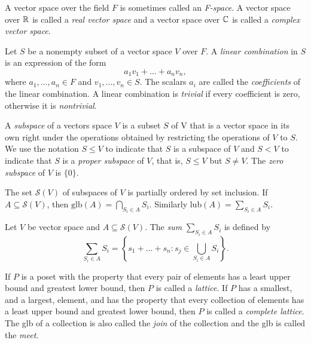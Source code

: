 \documentclass[12pt]{article}
\begin{document}
\begin{definition}[F-space]
    A vector space over the field $F$ is sometimes called an \textit{F-space}. A vector space over $\mathbb{R}$ is called a \textit{real vector space} and a vector space over $\mathbb{C}$ is called a \textit{complex vector space}.
\end{definition}
\newpage
\begin{definition}
    Let $S$ be a nonempty subset of a vector space $V$ over $F$. A \textit{linear combination} in $S$ is an expression of the form
    \begin{equation*}
        a_1v_1+\dots+a_nv_n,
    \end{equation*}
    where $a_1,\dots, a_n\in F$ and $v_1,\dots, v_n\in S$. The scalars $a_i$ are called the \textit{coefficients} of the linear combination. A linear combination is \textit{trivial} if every coefficient is zero, otherwise it is \textit{nontrivial}.
\end{definition}
\begin{definition}[Subspace]
    A \textit{subspace} of a vectors space $V$ is a subset $S$ of V that is a vector space in its own right under the operations obtained by restricting the operations of $V$ to $S$. We use the notation $S\leq V$ to indicate that $S$ is a subspace of $V$ and $S<V$ to indicate that $S$ is a \textit{proper subspace} of $V$, that is, $S\leq V$ but $S\neq V$. The \textit{zero subspace} of $V$ is $\{0\}$.
\end{definition}
\begin{remark}
    The set $\mathcal{S}(V)$ of subspaces of $V$ is partially ordered by set inclusion. If $A\subseteq \mathcal{S}(V)$, then $\text{glb}(A)=\bigcap_{S_i\in A} S_i$. Similarly lub$(A)=\sum_{S_i\in A} S_i$.
\end{remark}
\begin{definition}
    Let $V$ be vector space and $A\subseteq\mathcal{S}(V)$. The \textit{sum} $\sum_{S_i\in A} S_i$ is defined by 
    \begin{equation*}
        \sum_{S_i\in A} S_i=\left\{s_1+\dots +s_n: s_j\in \bigcup_{S_i\in A} S_i\right\}.
    \end{equation*}
\end{definition}
\begin{definition}[Lattice]
    If $P$ is a poset with the property that every pair of elements has a least upper bound and greatest lower bound, then $P$ is called a \textit{lattice}. If $P$ has a smallest, and a largest, element, and has the property that every collection of elements has a least upper bound and greatest lower bound, then $P$ is called a \textit{complete lattice}. The glb of a collection is also called the \textit{join} of the collection and the glb is called the \textit{meet}.
\end{definition}
\end{document}
